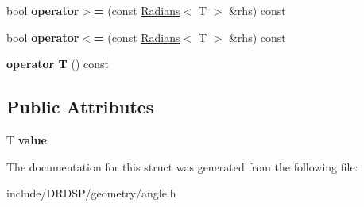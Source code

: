\begin{DoxyCompactItemize}
\item 
\hypertarget{struct_d_r_d_s_p_1_1_radians_aed74f8e6d3695c060acbbe3ce0a0d69e}{bool {\bfseries operator$>$=} (const \hyperlink{struct_d_r_d_s_p_1_1_radians}{Radians}$<$ T $>$ \&rhs) const }\label{struct_d_r_d_s_p_1_1_radians_aed74f8e6d3695c060acbbe3ce0a0d69e}

\item 
\hypertarget{struct_d_r_d_s_p_1_1_radians_a26075dcaba03a2319b9dd5988627932d}{bool {\bfseries operator$<$=} (const \hyperlink{struct_d_r_d_s_p_1_1_radians}{Radians}$<$ T $>$ \&rhs) const }\label{struct_d_r_d_s_p_1_1_radians_a26075dcaba03a2319b9dd5988627932d}

\item 
\hypertarget{struct_d_r_d_s_p_1_1_radians_a9bcf9fb721967c7f7dfffa36fbf9c820}{{\bfseries operator T} () const }\label{struct_d_r_d_s_p_1_1_radians_a9bcf9fb721967c7f7dfffa36fbf9c820}

\end{DoxyCompactItemize}
\subsection*{Public Attributes}
\begin{DoxyCompactItemize}
\item 
\hypertarget{struct_d_r_d_s_p_1_1_radians_a2de5e1b363f364e72f293bd300e5efbf}{T {\bfseries value}}\label{struct_d_r_d_s_p_1_1_radians_a2de5e1b363f364e72f293bd300e5efbf}

\end{DoxyCompactItemize}


The documentation for this struct was generated from the following file\-:\begin{DoxyCompactItemize}
\item 
include/\-D\-R\-D\-S\-P/geometry/angle.\-h\end{DoxyCompactItemize}
